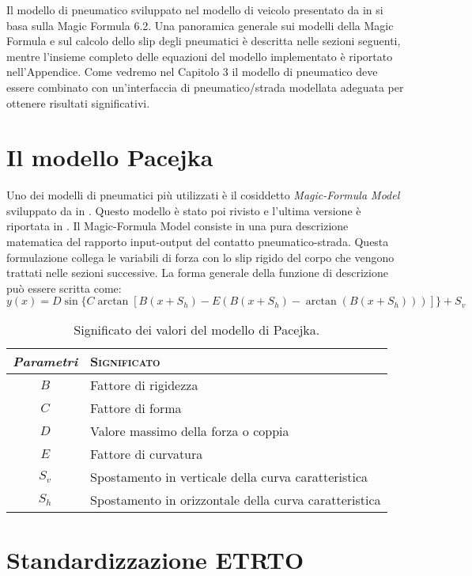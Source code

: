 Il modello di pneumatico sviluppato nel modello di veicolo presentato da \citeauthor{Larcher} in \cite{Larcher} si basa sulla Magic Formula 6.2. Una panoramica generale sui modelli della Magic Formula e sul calcolo dello slip degli pneumatici è descritta nelle sezioni seguenti, mentre l'insieme completo delle equazioni del modello implementato è riportato nell'Appendice.
Come vedremo nel Capitolo 3 il modello di pneumatico deve essere combinato con un'interfaccia di pneumatico/strada modellata adeguata per ottenere risultati significativi.
%
\section{Il modello Pacejka}
Uno dei modelli di pneumatici più utilizzati è il cosiddetto \textit{Magic-Formula Model} sviluppato da \citeauthor{bakker} in \cite{bakker}. Questo modello è stato poi rivisto e l'ultima versione è riportata in \cite{hans}. Il Magic-Formula Model consiste in una pura descrizione matematica del rapporto input-output del contatto pneumatico-strada. Questa formulazione collega le variabili di forza con lo slip rigido del corpo che vengono trattati nelle sezioni successive. La forma generale della funzione di descrizione può essere scritta come:
\begin{equation}
y(x) = D\sin\{C\arctan[B(x + S_h ) - E(B(x + S_h ) - \arctan(B(x + S_h )))]\} + S_v
\end{equation}



\begin{table}[h]
	\centering
	\begin{tabular}{cl}
		\toprule \emph{Parametri} & \textsc{Significato}\\
		\midrule
		$B$ & Fattore di rigidezza \\
		$C$ & Fattore di forma \\
		$D$ & Valore massimo della forza o coppia \\
		$E$ & Fattore di curvatura \\
		$S_v$ & Spostamento in verticale della curva caratteristica \\
		$S_h$ & Spostamento in orizzontale della curva caratteristica \\
		\bottomrule
	\end{tabular}
	\caption{Significato dei valori del modello di Pacejka.}
	\label{MFParams}
\end{table}

%
\section{Standardizzazione ETRTO}

